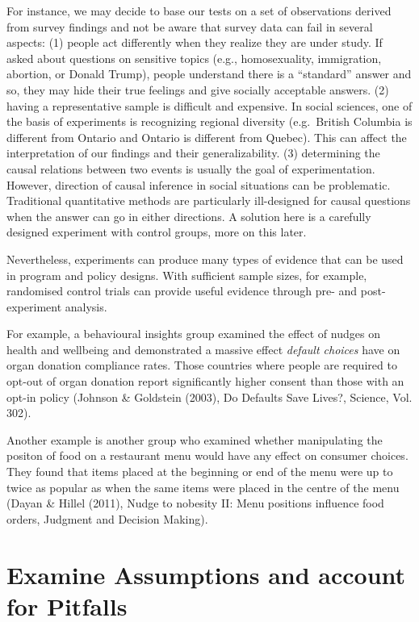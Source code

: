 \documentclass[openany]{book}
\begin{document}
For instance, we may decide to base our tests on a set of observations derived from survey findings and not be aware that survey data can fail in several aspects:
(1) people act differently when they realize they are under study. If asked about questions on sensitive topics (e.g., homosexuality, immigration, abortion, or Donald Trump), people understand there is a ``standard'' answer and so, they may hide their true feelings and give socially acceptable answers.
(2) having a representative sample is difficult and expensive. In social sciences, one of the basis of experiments is recognizing regional diversity (e.g.~British Columbia is different from Ontario and Ontario is different from Quebec). This can affect the interpretation of our findings and their generalizability.
(3) determining the causal relations between two events is usually the goal of experimentation. However, direction of causal inference in social situations can be problematic. Traditional quantitative methods are particularly ill-designed for causal questions when the answer can go in either directions. A solution here is a carefully designed experiment with control groups, more on this later.

Nevertheless, experiments can produce many types of evidence that can be used in program and policy designs. With sufficient sample sizes, for example, randomised control trials can provide useful evidence through pre- and post-experiment analysis.

For example, a behavioural insights group examined the effect of nudges on health and wellbeing and demonstrated a massive effect \emph{default choices} have on organ donation compliance rates. Those
countries where people are required to opt-out of organ donation report significantly higher consent than those with an opt-in policy (Johnson \& Goldstein (2003), Do Defaults Save Lives?, Science, Vol. 302).

Another example is another group who examined whether manipulating the positon of food on a restaurant
menu would have any effect on consumer choices. They found that items placed at the beginning or end of the menu were up to twice as popular as when the same items were placed in the centre of the menu (Dayan \& Hillel (2011), Nudge to nobesity II: Menu positions influence food orders, Judgment and Decision Making).

\hypertarget{examine-assumptions-and-account-for-pitfalls}{%
\chapter{Examine Assumptions and account for Pitfalls}\label{examine-assumptions-and-account-for-pitfalls}}
\end{document}
